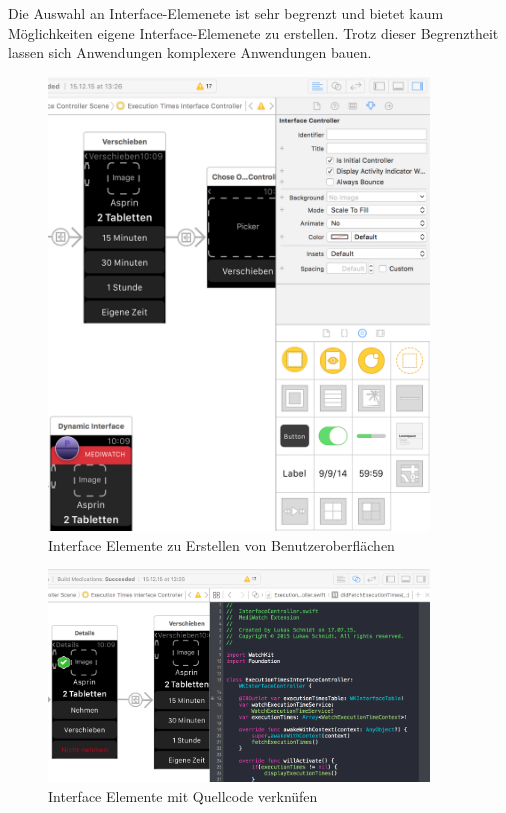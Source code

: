 Die Auswahl an Interface-Elemenete ist sehr begrenzt und bietet kaum Möglichkeiten eigene Interface-Elemenete zu erstellen. Trotz dieser Begrenztheit lassen sich Anwendungen komplexere Anwendungen bauen. 
\begin{figure}
	\caption{Interface Elemente zu Erstellen von Benutzeroberflächen}
	\label{fig:xcode-interface-elements}
	\centering
		\includegraphics[width=0.9\textwidth]{04_realisation/screenshots/xcode-interface-elements}
\end{figure}

\begin{figure}
	\caption{Interface Elemente mit Quellcode verknüfen}
	\label{fig:xcode-interface-code-connect}
	\centering
	\includegraphics[width=0.9\textwidth]{04_realisation/screenshots/xcode-interface-code-connect}
\end{figure}

